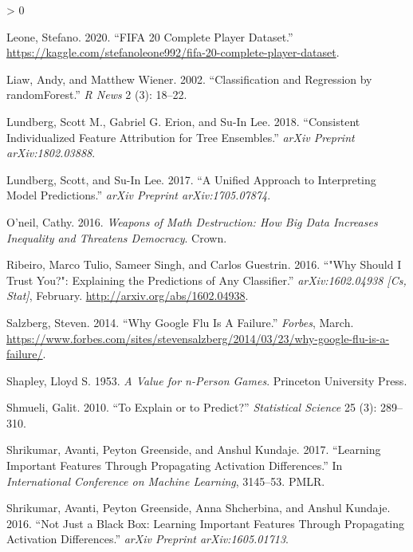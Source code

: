 \documentclass[
  article]{article}
\newlength{\cslhangindent}
\newenvironment{CSLReferences}[2] %
 {%
  \setlength{\parindent}{0pt}
  \ifodd #1 \everypar{\setlength{\hangindent}{\cslhangindent}}\ignorespaces\fi
  \ifnum #2 > 0
  \setlength{\parskip}{#2\baselineskip}
  \fi
 }%
 {}
\begin{document}
\begin{CSLReferences}{1}{0}
\leavevmode\hypertarget{ref-leone_fifa_2020}{}%
Leone, Stefano. 2020. {``{FIFA} 20 Complete Player Dataset.''} \url{https://kaggle.com/stefanoleone992/fifa-20-complete-player-dataset}.

\leavevmode\hypertarget{ref-liaw_classification_2002}{}%
Liaw, Andy, and Matthew Wiener. 2002. {``Classification and Regression by {randomForest}.''} \emph{R News} 2 (3): 18--22.

\leavevmode\hypertarget{ref-lundberg_consistent_2018}{}%
Lundberg, Scott M., Gabriel G. Erion, and Su-In Lee. 2018. {``Consistent Individualized Feature Attribution for Tree Ensembles.''} \emph{arXiv Preprint arXiv:1802.03888}.

\leavevmode\hypertarget{ref-lundberg_unified_2017}{}%
Lundberg, Scott, and Su-In Lee. 2017. {``A Unified Approach to Interpreting Model Predictions.''} \emph{arXiv Preprint arXiv:1705.07874}.

\leavevmode\hypertarget{ref-oneil_weapons_2016}{}%
O'neil, Cathy. 2016. \emph{Weapons of Math Destruction: {How} Big Data Increases Inequality and Threatens Democracy}. Crown.

\leavevmode\hypertarget{ref-ribeiro_why_2016}{}%
Ribeiro, Marco Tulio, Sameer Singh, and Carlos Guestrin. 2016. {``"{Why} {Should} {I} {Trust} {You}?": {Explaining} the {Predictions} of {Any} {Classifier}.''} \emph{arXiv:1602.04938 {[}Cs, Stat{]}}, February. \url{http://arxiv.org/abs/1602.04938}.

\leavevmode\hypertarget{ref-salzberg_why_2014}{}%
Salzberg, Steven. 2014. {``Why {Google} {Flu} {Is} {A} {Failure}.''} \emph{Forbes}, March. \url{https://www.forbes.com/sites/stevensalzberg/2014/03/23/why-google-flu-is-a-failure/}.

\leavevmode\hypertarget{ref-shapley_value_1953}{}%
Shapley, Lloyd S. 1953. \emph{A Value for n-Person Games}. Princeton University Press.

\leavevmode\hypertarget{ref-shmueli_explain_2010}{}%
Shmueli, Galit. 2010. {``To Explain or to Predict?''} \emph{Statistical Science} 25 (3): 289--310.

\leavevmode\hypertarget{ref-shrikumar_learning_2017}{}%
Shrikumar, Avanti, Peyton Greenside, and Anshul Kundaje. 2017. {``Learning Important Features Through Propagating Activation Differences.''} In \emph{International {Conference} on {Machine} {Learning}}, 3145--53. PMLR.

\leavevmode\hypertarget{ref-shrikumar_not_2016}{}%
Shrikumar, Avanti, Peyton Greenside, Anna Shcherbina, and Anshul Kundaje. 2016. {``Not Just a Black Box: {Learning} Important Features Through Propagating Activation Differences.''} \emph{arXiv Preprint arXiv:1605.01713}.


\end{CSLReferences}
\end{document}
